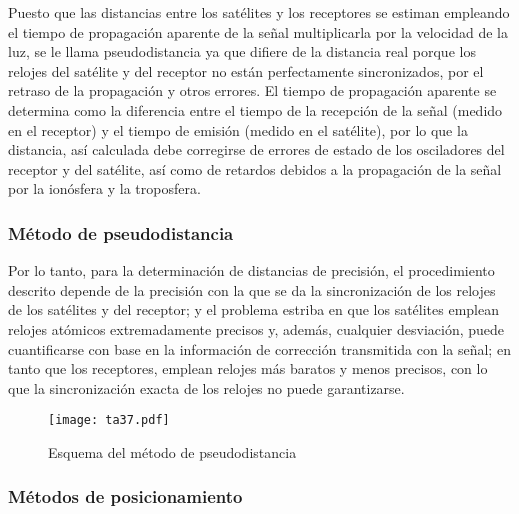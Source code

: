 Puesto que las distancias entre los satélites y los receptores se estiman empleando el tiempo de propagación aparente de la señal multiplicarla por la velocidad de la luz, se le llama pseudodistancia ya que difiere de la distancia real porque los relojes del satélite y del receptor no están perfectamente sincronizados, por el retraso de la propagación y otros errores. El tiempo de propagación aparente se determina como la diferencia entre el tiempo de la recepción de la señal (medido en el receptor) y el tiempo de emisión (medido en el satélite), por lo que la distancia, así calculada debe corregirse de errores de estado de los osciladores del receptor y del satélite, así como de retardos debidos a la propagación de la señal por la ionósfera y la troposfera.
\subsubsection{Método de pseudodistancia}
Por lo tanto, para la determinación de distancias de precisión, el procedimiento descrito depende de la precisión con la que se da la sincronización de los relojes de los satélites y del receptor; y el problema estriba en que los satélites emplean relojes atómicos extremadamente precisos y, además, cualquier desviación, puede cuantificarse con base en la información de corrección transmitida con la señal; en tanto que los receptores, emplean relojes más baratos y menos precisos, con lo que la sincronización exacta de los relojes no puede garantizarse.
\begin{figure}[h!]
\centering
  \texttt{[image: ta37.pdf]}
  \caption{Esquema del método de pseudodistancia}
  \label{ta37}
\end{figure}

\subsubsection{Métodos de posicionamiento}

